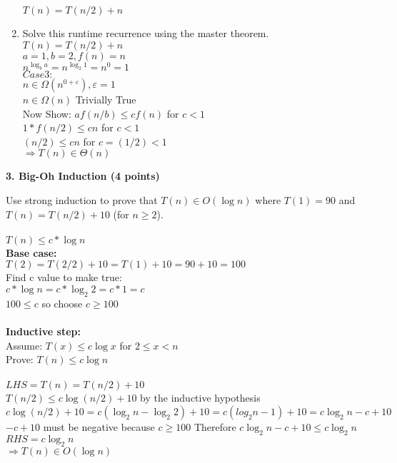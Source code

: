 \documentclass[12pt]{elsart}
\begin{document}
\begin{enumerate}
	$\boxed{T(n) = T(n/2)+n}$\\
 \item Solve this runtime recurrence using the master theorem.\\
	$T(n) = T(n/2)+n$\\
	$a=1, b=2, f(n)=n$\\
	$n^{\log_b a}=n^{\log_2 1}=n^0=1$\\
	$Case 3:$\\
	$n \in \Omega (n^{0+\varepsilon}), \varepsilon=1$\\
	$n \in \Omega (n)$ Trivially True\\
	Now Show: $af(n/b) \leq cf(n)$ for $c<1$\\
	$1*f(n/2) \leq cn$ for $c<1$\\
	$(n/2) \leq cn$ for $c=(1/2)<1$\\
	$\Rightarrow \boxed{T(n) \in \Theta (n)}$\\
\end{enumerate}
\newpage
{\bf 3. Big-Oh Induction (4 points)}

Use strong induction to prove that $T(n) \in O(\log n)$ where $T(1) = 90$ and $T(n) = T(n/2) + 10$ (for $n \geq 2$).\\\\
	$T(n) \leq c*\log n$\\
	{\bf Base case:}\\
	$T(2)=T(2/2)+10=T(1)+10=90+10=100$\\
	Find c value to make true:\\
	$c*\log n = c*\log_2 2=c*1=c$\\
	$100 \leq c$ so choose $c \geq 100$\\\\
	{\bf Inductive step:}\\
	Assume: $T(x) \leq c\log x$ for $2\leq x < n$\\
	Prove: $T(n) \leq c\log n$\\\\
	$LHS = T(n) = T(n/2) + 10$\\
	$T(n/2) \leq c\log (n/2) +10$ by the inductive hypothesis\\
	$c\log (n/2) +10 = c(\log_2 n - \log_2 2) +10 = c(log_2 n - 1) +10 = c\log_2 n - c +10$\\
	$-c + 10$ must be negative because $c \geq 100$
	Therefore $ c\log_2 n - c +10 \leq c\log_2 n$\\
	$RHS = c\log_2 n$\\
	$\Rightarrow \boxed{T(n) \in O(\log n)}$\\
	
\end{document}
